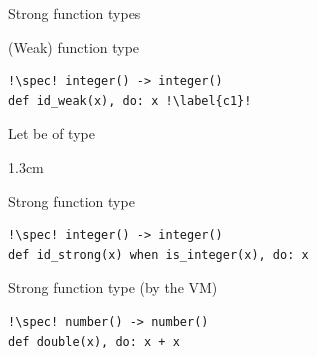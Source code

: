 \begin{frame}[fragile]{Strong function types}
\vspace{-1.5mm}
\begin{block}{(Weak) function type}
\begin{verbatim}
!\spec! integer() -> integer()
def id_weak(x), do: x !\label{c1}!
\end{verbatim}
\end{block}
\vspace{-1.6mm}
\pause
\begin{block}{Let  be of type }
\vspace{-4.9mm}
    \begin{overlayarea}{\textwidth}{1.3cm}
   \end{overlayarea}
\end{block}
\vspace{-1.5mm}
\pause
\begin{block}{Strong function type }
\begin{verbatim}
!\spec! integer() -> integer()
def id_strong(x) when is_integer(x), do: x 
\end{verbatim}
\end{block}
\pause\pause\pause\pause
\vspace{-.5mm}
\begin{block}{Strong function type (by the VM)}
\begin{verbatim}
!\spec! number() -> number()
def double(x), do: x + x
\end{verbatim}
\end{block}

\end{frame}
